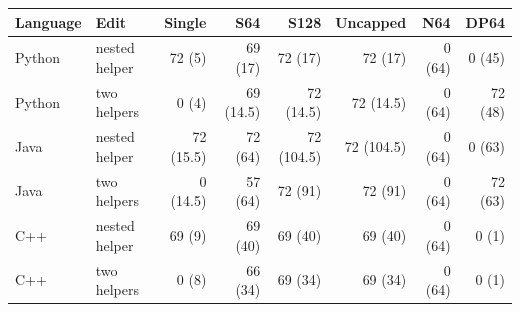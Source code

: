 \begin{tabular}{llrrrrrr}
\toprule
Language & Edit & Single & S64 & S128 & Uncapped & N64 & DP64 \\
\midrule
Python & nested helper & 72 (5) & 69 (17) & 72 (17) & 72 (17) & 0 (64) & 0 (45) \\
Python & two helpers & 0 (4) & 69 (14.5) & 72 (14.5) & 72 (14.5) & 0 (64) & 72 (48) \\
Java & nested helper & 72 (15.5) & 72 (64) & 72 (104.5) & 72 (104.5) & 0 (64) & 0 (63) \\
Java & two helpers & 0 (14.5) & 57 (64) & 72 (91) & 72 (91) & 0 (64) & 72 (63) \\
C++ & nested helper & 69 (9) & 69 (40) & 69 (40) & 69 (40) & 0 (64) & 0 (1) \\
C++ & two helpers & 0 (8) & 66 (34) & 69 (34) & 69 (34) & 0 (64) & 0 (1) \\
\bottomrule
\end{tabular}
